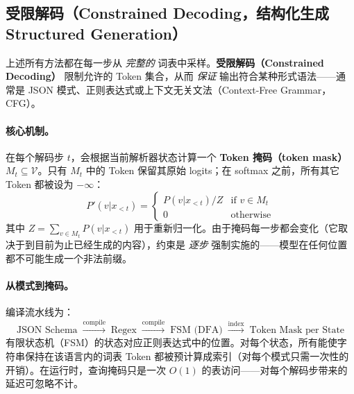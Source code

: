 \subsection{受限解码（Constrained Decoding，结构化生成 Structured Generation）}
\label{sec:constrained-decoding}

上述所有方法都在每一步从 \emph{完整的} 词表中采样。\textbf{受限解码（Constrained Decoding）} 限制允许的 Token 集合，从而 \emph{保证} 输出符合某种形式语法——通常是 JSON 模式、正则表达式或上下文无关文法（Context-Free Grammar，CFG）。

\paragraph{核心机制。}
\label{core-mechanism.}

在每个解码步 $t$，会根据当前解析器状态计算一个 \textbf{Token 掩码（token mask）} $M_t \subseteq \mathcal{V}$。只有 $M_t$ 中的 Token 保留其原始 logits；在 softmax 之前，所有其它 Token 都被设为 $-\infty$：
\[
P'(v | x_{<t}) = \begin{cases}
    P(v | x_{<t}) / Z & \text{if } v \in M_t \\
    0 & \text{otherwise}
  \end{cases}
\]
其中 $Z = \sum_{v \in M_t} P(v | x_{<t})$ 用于重新归一化。由于掩码每一步都会变化（它取决于到目前为止已经生成的内容），约束是 \emph{逐步} 强制实施的——模型在任何位置都不可能生成一个非法前缀。

\paragraph{从模式到掩码。}
\label{from-schema-to-mask.}

编译流水线为：
\[
\text{JSON Schema} \;\xrightarrow{\text{compile}}\; \text{Regex}
  \;\xrightarrow{\text{compile}}\; \text{FSM (DFA)}
  \;\xrightarrow{\text{index}}\; \text{Token Mask per State}
\]
有限状态机（FSM）的状态对应正则表达式中的位置。对每个状态，所有能使字符串保持在该语言内的词表 Token 都被预计算成索引（对每个模式只需一次性的开销）。在运行时，查询掩码只是一次 $O(1)$ 的表访问——对每个解码步带来的延迟可忽略不计。

